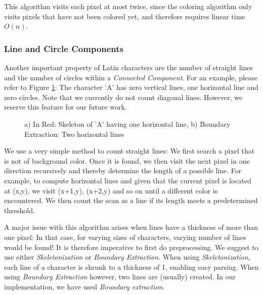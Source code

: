 \documentclass{article}
\begin{document}
This algorithm visits each pixel at most twice, since the coloring algorithm only visits pixels that have not been colored yet, and therefore requires linear time $O(n)$.

\subsubsection{Line and Circle Components}
Another important property of Latin characters are the number of straight lines and the number of circles within a \textit{Connected Component}. For an example, please refer to Figure \ref{fig:lines}: The character 'A' has zero vertical lines, one horizontal line and zero circles. Note that we currently do not count diagonal lines. However, we reserve this feature for our future work.

\begin{figure}
 \centering
 
 \caption{a) In Red: Skeleton of 'A' having one horizontal line, b) Boundary Extraction: Two horizontal lines}
\label{fig:lines}
\end{figure}

We use a very simple method to count straight lines: We first search a pixel that is not of background color. Once it is found, we then visit the next pixel in one direction recursively and thereby determine the length of a possible line. For example, to compute horizontal lines and given that the current pixel is located at (x,y), we visit (x+1,y), (x+2,y) and so on until a different color is encountered. We then count the scan as a line if its length meets a predetermined threshold.

A major issue with this algorithm arises when lines have a thickness of more than one pixel: In that case, for varying sizes of characters, varying number of lines would be found! It is therefore imperative to first do preprocessing. We suggest to use either \textit{Skeletonization} or \textit{Boundary Extraction}. When using \textit{Skeletonization}, each line of a character is shrunk to a thickness of 1, enabling easy parsing. When using \textit{Boundary Extraction} however, two lines are (usually) created. In our implementation, we have used \textit{Boundary extraction}.
\end{document}
